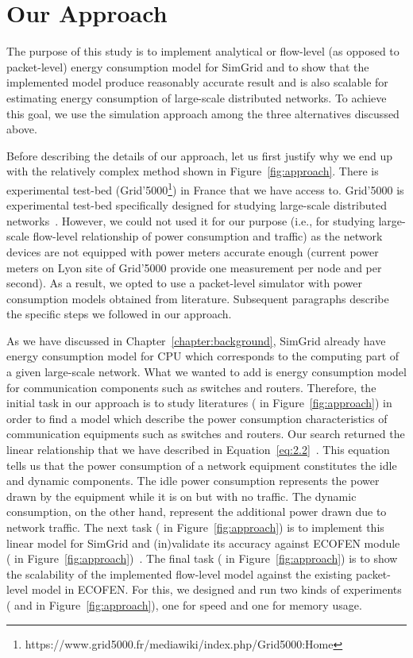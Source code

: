 \section{Our Approach}
\label{section:ourapproach}
The purpose of this study is to implement analytical or flow-level (as opposed to packet-level) energy consumption model for SimGrid and to show that the implemented model produce reasonably accurate result and is also scalable for estimating energy consumption of large-scale distributed networks. To achieve this goal, we use the simulation approach among the three alternatives discussed above. 

Before describing the details of our approach, let us first justify why we end up with the relatively complex method shown in Figure~\ref{fig:approach}. There is experimental test-bed (Grid'5000\footnote{https://www.grid5000.fr/mediawiki/index.php/Grid5000:Home}) in France that we have access to. Grid'5000 is experimental test-bed specifically designed for studying large-scale distributed networks~\cite{DBLP:journals/ijhpca/BolzeCCDDJJLLMMNPQRTT06}. However, we could not used it for our purpose (i.e., for studying large-scale flow-level relationship of power consumption and traffic) as the network devices are not equipped with power meters accurate enough (current power meters on Lyon site of Grid'5000 provide one measurement per node and per second). As a result, we opted to use a packet-level simulator with power consumption models obtained from literature. Subsequent paragraphs describe the specific steps we followed in our approach.

As we have discussed in Chapter~\ref{chapter:background}, SimGrid already have energy consumption model for CPU which corresponds to the computing part of a given large-scale network. What we wanted to add is energy consumption model for communication components such as switches and routers. Therefore, the initial task in our approach is to study literatures ( in Figure~\ref{fig:approach}) in order to find a model which describe the power consumption characteristics of communication equipments such as switches and routers. Our search returned the linear relationship that we have described in Equation~\ref{eq:2.2}~\cite{Sivaraman,DBLP:journals/comcom/BeisterDAK14,DBLP:conf/networking/MahadevanSBR09,DBLP:conf/sigcomm/MahadevanBS10}. This equation tells us that the power consumption of a network equipment constitutes the idle and dynamic components. The idle power consumption represents the power drawn by the equipment while it is on but with no traffic. The dynamic consumption, on the other hand, represent the additional power drawn due to network traffic. The next task ( in Figure~\ref{fig:approach}) is to implement this linear model for SimGrid and (in)validate its accuracy against ECOFEN module ( in Figure~\ref{fig:approach})~\cite{DBLP:conf/wowmom/OrgerieLLL11,DBLP:conf/cloudnet/CorneaOL14}. The final task ( in Figure~\ref{fig:approach}) is to show the scalability of the implemented flow-level model against the existing packet-level model in ECOFEN. For this, we designed and run two kinds of experiments ( and  in Figure~\ref{fig:approach}), one for speed and one for memory usage. 

